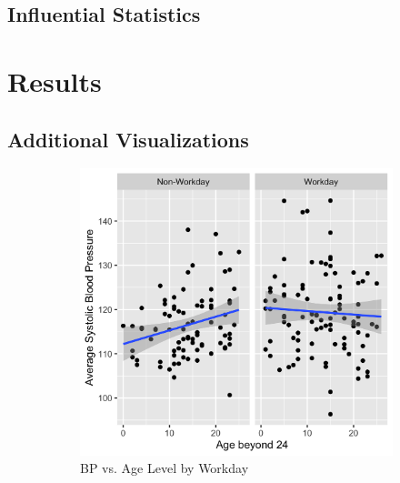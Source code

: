 \documentclass[12pt,twoside,letterpaper]{article}
\theoremstyle{definition}
\theoremstyle{definition}
\begin{document}
\subsection{Influential Statistics}\label{sec: infl stat}

\section{Results}\label{sec: results}


\begin{appendices}
    \section{Additional Visualizations}\label{sec: add visuals}

    \begin{figure}[h] 
        \centering
        \begin{subfigure}[b]{0.3\textwidth}
        \centering
        \includegraphics[width=\textwidth]{pics/bp by age and day.png}
        \caption[]%
        {{\small BP vs. Age Level by Workday}}
        \label{fig: bp v age and day}
        \end{subfigure}
        \hfill
        \begin{subfigure}[b]{0.3\textwidth}
        \centering

\end{subfigure}
\end{figure}
\end{appendices}
\end{document}
